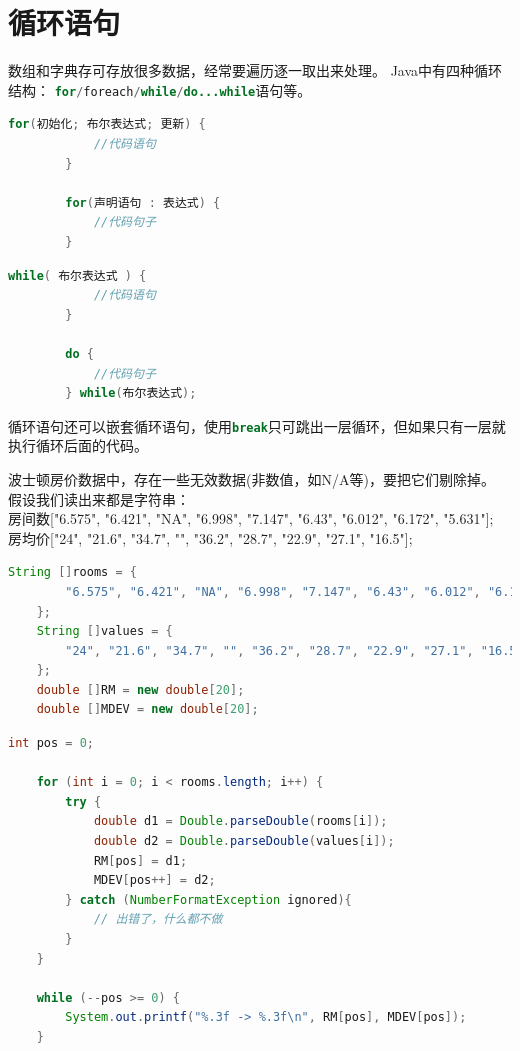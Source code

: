 \section{循环语句}
	数组和字典存可存放很多数据，经常要遍历逐一取出来处理。
	Java中有四种循环结构：
	\lstinline[language=Java]{for/foreach/while/do...while}语句等。

	\begin{minipage}[t]{0.45\textwidth}
	\begin{lstlisting}[language=Java]
		for(初始化; 布尔表达式; 更新) {
			//代码语句
		}

		for(声明语句 : 表达式) {
			//代码句子
		}
	\end{lstlisting}
	\end{minipage}
	\quad
	\begin{minipage}[t]{0.4\textwidth}
	\begin{lstlisting}[language=Java]
		while( 布尔表达式 ) {  
			//代码语句
		}

		do {
			//代码句子
		} while(布尔表达式);
	\end{lstlisting}
	\end{minipage}
	
	\noindent
	循环语句还可以嵌套循环语句，使用\lstinline[language=Java]{break}只可跳出一层循环，但如果只有一层就执行循环后面的代码。
	\bigskip

	\begin{example}
		波士顿房价数据中，存在一些无效数据(非数值，如N/A等)，要把它们剔除掉。
		假设我们读出来都是字符串：\\
		房间数["6.575", "6.421", "NA", "6.998", "7.147", "6.43", "6.012", "6.172", "5.631"];\\
		房均价["24", "21.6", "34.7", "", "36.2", "28.7", "22.9", "27.1", "16.5"];
	\end{example}

\begin{lstlisting}[language=Java]
	String []rooms = {
		"6.575", "6.421", "NA", "6.998", "7.147", "6.43", "6.012", "6.172", "5.631"
	};
	String []values = {
		"24", "21.6", "34.7", "", "36.2", "28.7", "22.9", "27.1", "16.5"
	};
	double []RM = new double[20];
	double []MDEV = new double[20];
\end{lstlisting}

\begin{lstlisting}[language=Java]
	int pos = 0;

	for (int i = 0; i < rooms.length; i++) {
		try {
			double d1 = Double.parseDouble(rooms[i]);
			double d2 = Double.parseDouble(values[i]);
			RM[pos] = d1;
			MDEV[pos++] = d2;
		} catch (NumberFormatException ignored){
			// 出错了，什么都不做
		}
	}

	while (--pos >= 0) {
		System.out.printf("%.3f -> %.3f\n", RM[pos], MDEV[pos]);
	}
\end{lstlisting}

